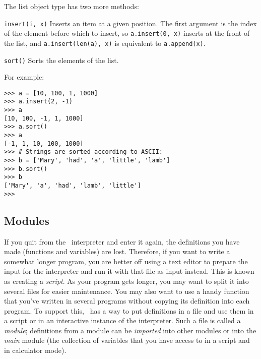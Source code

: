 The list object type has two more methods:
\begin{list}{}{}
\item[{\tt insert(i, x)}]
Inserts an item at a given position.
The first argument is the index of the element before which to insert,
so {\tt a.insert(0, x)} inserts at the front of the list, and
{\tt a.insert(len(a), x)} is equivalent to {\tt a.append(x)}.
\item[{\tt sort()}]
Sorts the elements of the list.
\end{list}
For example:
\begin{code}\begin{verbatim}
>>> a = [10, 100, 1, 1000]
>>> a.insert(2, -1)
>>> a
[10, 100, -1, 1, 1000]
>>> a.sort()
>>> a
[-1, 1, 10, 100, 1000]
>>> # Strings are sorted according to ASCII:
>>> b = ['Mary', 'had', 'a', 'little', 'lamb']
>>> b.sort()
>>> b
['Mary', 'a', 'had', 'lamb', 'little']
>>> 
\end{verbatim}\end{code}

\subsection{Modules}

If you quit from the \Python\ interpreter and enter it again, the
definitions you have made (functions and variables) are lost.
Therefore, if you want to write a somewhat longer program, you are
better off using a text editor to prepare the input for the interpreter
and run it with that file as input instead.
This is known as creating a
{\it script}.
As your program gets longer, you may want to split it into several files
for easier maintenance.
You may also want to use a handy function that you've written in several
programs without copying its definition into each program.
To support this, \Python\ has a way to put definitions in a file and use
them in a script or in an interactive instance of the interpreter.
Such a file is called a
{\it module};
definitions from a module can be
{\it imported}
into other modules or into the
{\it main}
module (the collection of variables that you have access to in
a script and in calculator mode).

